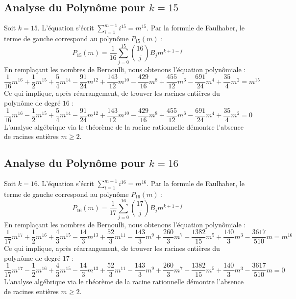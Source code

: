 \documentclass[11pt,a4paper]{article}
\begin{document}
\subsection{Analyse du Polynôme pour $k = 15$}
Soit $k = 15$. L'équation s'écrit $\sum_{i=1}^{m-1} i^{15} = m^{15}$.
Par la formule de Faulhaber, le terme de gauche correspond au polynôme $P_{15}(m)$ :
$$ P_{15}(m) = \frac{1}{16} \sum_{j=0}^{15} \binom{16}{j} B_j m^{k+1-j} $$
En remplaçant les nombres de Bernoulli, nous obtenons l'équation polynômiale :
$$ \frac{1}{16} m^16+\frac{1}{2} m^15+\frac{5}{4} m^14-\frac{91}{24} m^12+\frac{143}{12} m^10-\frac{429}{16} m^8+\frac{455}{12} m^6-\frac{691}{24} m^4+\frac{35}{4} m^2 = m^{15} $$
Ce qui implique, après réarrangement, de trouver les racines entières du polynôme de degré $16$ :
$$ \frac{1}{16} m^16-\frac{1}{2} m^15+\frac{5}{4} m^14-\frac{91}{24} m^12+\frac{143}{12} m^10-\frac{429}{16} m^8+\frac{455}{12} m^6-\frac{691}{24} m^4+\frac{35}{4} m^2 = 0 $$
L'analyse algébrique via le théorème de la racine rationnelle démontre l'absence de racines entières $m \geq 2$.

\subsection{Analyse du Polynôme pour $k = 16$}
Soit $k = 16$. L'équation s'écrit $\sum_{i=1}^{m-1} i^{16} = m^{16}$.
Par la formule de Faulhaber, le terme de gauche correspond au polynôme $P_{16}(m)$ :
$$ P_{16}(m) = \frac{1}{17} \sum_{j=0}^{16} \binom{17}{j} B_j m^{k+1-j} $$
En remplaçant les nombres de Bernoulli, nous obtenons l'équation polynômiale :
$$ \frac{1}{17} m^17+\frac{1}{2} m^16+\frac{4}{3} m^15-\frac{14}{3} m^13+\frac{52}{3} m^11-\frac{143}{3} m^9+\frac{260}{3} m^7-\frac{1382}{15} m^5+\frac{140}{3} m^3-\frac{3617}{510} m = m^{16} $$
Ce qui implique, après réarrangement, de trouver les racines entières du polynôme de degré $17$ :
$$ \frac{1}{17} m^17-\frac{1}{2} m^16+\frac{4}{3} m^15-\frac{14}{3} m^13+\frac{52}{3} m^11-\frac{143}{3} m^9+\frac{260}{3} m^7-\frac{1382}{15} m^5+\frac{140}{3} m^3-\frac{3617}{510} m = 0 $$
L'analyse algébrique via le théorème de la racine rationnelle démontre l'absence de racines entières $m \geq 2$.
\end{document}
